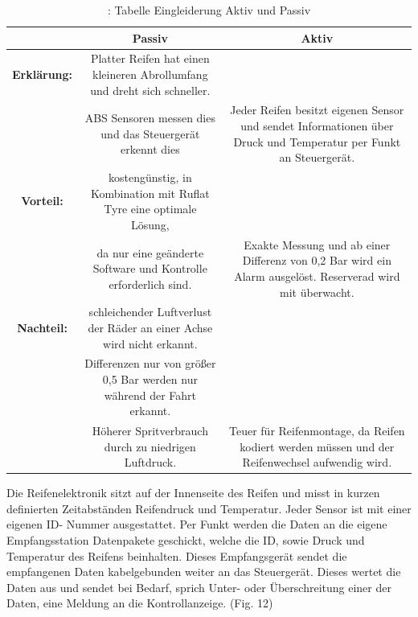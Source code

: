 	\begin{table}	
		\begin{tabular}{c|c|c}
			
			\textbf {  } & \textbf{Passiv} & \textbf {Aktiv}\\
			
			
			\hline
			\textbf{Erklärung:} & Platter Reifen hat einen kleineren Abrollumfang und dreht sich schneller.\\&ABS Sensoren messen dies und das Steuergerät erkennt dies & Jeder Reifen besitzt eigenen Sensor und sendet Informationen über Druck und Temperatur per Funkt an Steuergerät.\\
			
			
			\hline
			\textbf{Vorteil:} & kostengünstig, in Kombination mit Ruflat Tyre eine optimale Lösung, \\&da nur eine geänderte Software und Kontrolle erforderlich sind. & Exakte Messung und ab einer Differenz von 0,2 Bar wird ein Alarm ausgelöst. Reserverad wird mit überwacht.\\
			
			
			\hline
			\textbf{Nachteil:} & schleichender Luftverlust der Räder an einer Achse wird nicht erkannt.\\&Differenzen nur von größer 0,5 Bar werden nur während der Fahrt erkannt.\\&  Höherer Spritverbrauch durch zu niedrigen Luftdruck. & Teuer für Reifenmontage, da Reifen kodiert werden müssen und der Reifenwechsel aufwendig wird.\\
			\hline
			
		\end{tabular}
		\caption{ \cite{TS_rdks}: Tabelle Eingleiderung Aktiv und Passiv}
	\end{table}	
	
	
	\begin{flushleft}
		
		Die Reifenelektronik sitzt auf der Innenseite des Reifen und misst in kurzen definierten Zeitabständen Reifendruck und Temperatur. Jeder Sensor ist mit einer eigenen ID- Nummer ausgestattet. Per Funkt werden die Daten an die eigene Empfangsstation Datenpakete geschickt, welche die ID, sowie Druck und Temperatur des Reifens beinhalten. Dieses Empfangsgerät sendet die empfangenen Daten kabelgebunden weiter an das Steuergerät. Dieses wertet die Daten aus und sendet bei Bedarf, sprich Unter- oder Überschreitung einer der Daten, eine Meldung an die Kontrollanzeige. (Fig. 12)
		
	\end{flushleft}	
	

